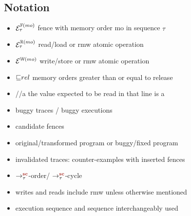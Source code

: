 \subsection{Notation}
\begin{itemize}
	\item $\ordfences{mo}_\tau$ \quad fence with memory order mo in sequence $\tau$
	\item $\ordreads{mo}_\tau$ \quad read/load or rmw atomic operation
	\item $\ordwrites{mo}$ \qquad write/store or rmw atomic operation
	\item $\mole rel$ \qquad memory orders greater than or equal to release
	\item \color{olive}//a \color{black} \qquad the value expected to be read in that line is a
	\item buggy traces / buggy executions
	\item candidate fences
	\item original/transformed program or buggy/fixed program
	\item invalidated traces: counter-examples with inserted fences
	\item $\setSC$-order/ $\setSC$-cycle
	\item writes and reads include rmw unless otherwise mentioned
	\item execution sequence and sequence interchangeably used
\end{itemize}